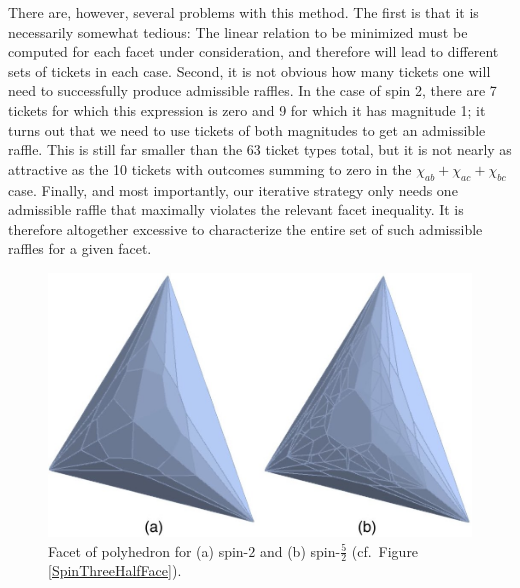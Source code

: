 There are, however, several problems with this method. The first is that it is necessarily somewhat tedious: The linear relation to be minimized must be computed for each facet under consideration, and therefore will lead to different sets of tickets in each case. Second, it is not obvious how many tickets one will need to successfully produce admissible raffles. In the case of spin 2, there are 7 tickets for which this expression is zero and 9 for which it has magnitude 1; it turns out that we need to use tickets of both magnitudes to get an admissible raffle. This is still far smaller than the 63 ticket types total, but it is not nearly as attractive as the 10 tickets with outcomes summing to zero in the $\chi_{ab}+\chi_{ac}+\chi_{bc}$ case. Finally, and most importantly, our iterative strategy only needs one admissible raffle that maximally violates the relevant facet inequality. It is therefore altogether excessive to characterize the entire set of such admissible raffles for a given facet.

\begin{figure}[ht]
 \centering
   \includegraphics[width=4.5in]{FacetsSpin2Spin52.jpeg} 
   \caption{Facet of polyhedron for (a) spin-$2$ and (b) spin-$\frac52$ (cf.\ Figure \ref{SpinThreeHalfFace}).}
   \label{FacetsSpin2Spin52}
\end{figure}

